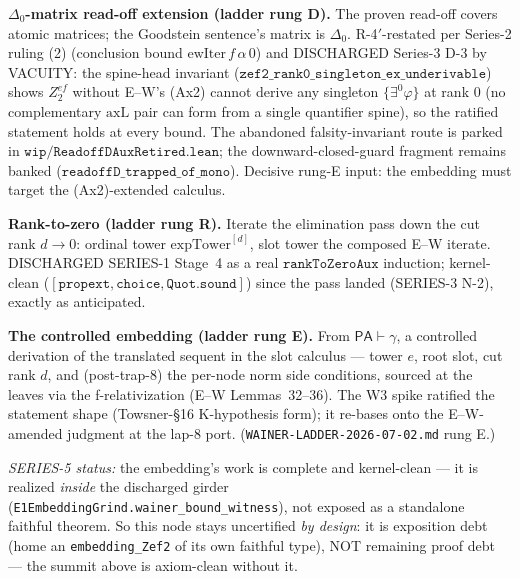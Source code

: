 \begin{theorem}\label{thm:zeh_readoff_delta0}
  \leanok
\textbf{\(\Delta_0\)-matrix read-off extension (ladder rung D).}  The proven read-off covers atomic
matrices; the Goodstein sentence's matrix is \(\Delta_0\).  R-4\('\)-restated per Series-2 ruling (2)
(conclusion bound \(\mathrm{ewIter}\,f\,\alpha\,0\)) and DISCHARGED Series-3 D-3 by VACUITY: the
spine-head invariant (\(\texttt{zef2\_rank0\_singleton\_ex\_underivable}\)) shows \(Z^{ef}_2\)
without E--W's (Ax2) cannot derive any singleton \(\{\exists^0\varphi\}\) at rank 0 (no complementary
\(\mathrm{axL}\) pair can form from a single quantifier spine), so the ratified statement holds at
every bound.  The abandoned falsity-invariant route is parked in
\(\texttt{wip/ReadoffDAuxRetired.lean}\); the downward-closed-guard fragment remains banked
(\(\texttt{readoffD\_trapped\_of\_mono}\)).  Decisive rung-E input: the embedding must target the
(Ax2)-extended calculus.
\end{theorem}

\begin{theorem}\label{thm:zeh_rank_zero}
  \leanok
\textbf{Rank-to-zero (ladder rung R).}  Iterate the elimination pass down the cut rank
\(d \to 0\): ordinal tower \(\mathrm{expTower}^{[d]}\), slot tower the composed E--W iterate.
DISCHARGED SERIES-1 Stage~4 as a real \(\texttt{rankToZeroAux}\) induction; kernel-clean
(\([\texttt{propext},\texttt{choice},\texttt{Quot.sound}]\)) since the pass landed (SERIES-3
N-2), exactly as anticipated.
\end{theorem}

\begin{theorem}\label{thm:zeh_embedding}
  \notready
\textbf{The controlled embedding (ladder rung E).}  From \(\mathsf{PA}\vdash\gamma\), a controlled
derivation of the translated sequent in the slot calculus --- tower \(e\), root slot, cut rank
\(d\), and (post-trap-8) the per-node norm side conditions, sourced at the leaves via the
f-relativization (E--W Lemmas~32--36).  The W3 spike ratified the statement shape
(Towsner-\S16 K-hypothesis form); it re-bases onto the E--W-amended judgment at the lap-8 port.
(\texttt{WAINER-LADDER-2026-07-02.md} rung E.)

\emph{SERIES-5 status:} the embedding's work is complete and kernel-clean --- it is realized
\emph{inside} the discharged girder (\texttt{E1EmbeddingGrind.wainer\_bound\_witness}), not exposed
as a standalone faithful theorem.  So this node stays uncertified \emph{by design}: it is exposition
debt (home an \texttt{embedding\_Zef2} of its own faithful type), NOT remaining proof debt --- the
summit above is axiom-clean without it.
\end{theorem}

